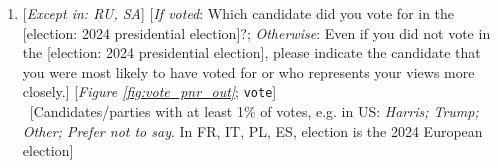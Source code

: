 \documentclass[12pt,english]{article}
\begin{document}
\begin{bibunit}
\begin{enumerate}[resume]
\item  \label{q:vote} [\textit{Except in: RU, SA}] [\textit{If voted}: Which candidate did you vote for in the [election: 2024 presidential election]?; \textit{Otherwise}: Even if you did not vote in the [election: 2024 presidential election], please indicate the candidate that you were most likely to have voted for or who represents your views more closely.] [\textit{Figure%
\ref{fig:vote_pnr_out}}; 
\verb|vote|]
  \\ ~[Candidates/parties with at least 1\% of votes, e.g. in US: \textit{Harris; Trump; Other; Prefer not to say}. In FR, IT, PL, ES, election is the 2024 European election]





\end{enumerate}
\end{bibunit}
\end{document}
